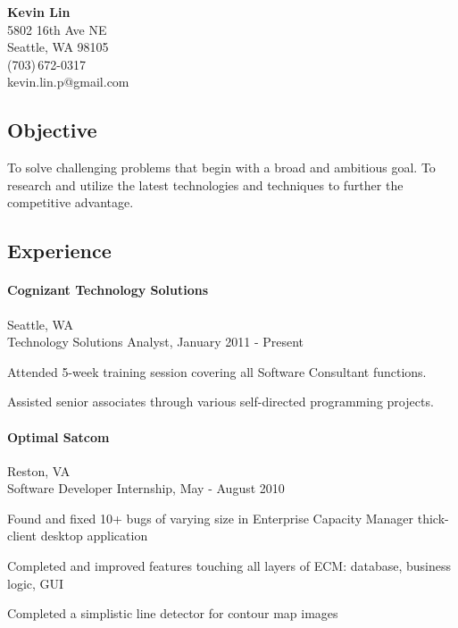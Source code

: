 \documentclass[10pt]{article}
\begin{document}
\begin{center}
\textbf{Kevin Lin} \\
5802 16th Ave NE \\ Seattle, WA 98105 \\
(703)\,672-0317\\
kevin.lin.p@gmail.com \\
\end{center}


\subsection*{Objective}
To solve challenging problems that begin with a broad and ambitious goal. To research and utilize the latest technologies and techniques to further the competitive advantage.


\subsection*{Experience}

\paragraph*{Cognizant Technology Solutions}
Seattle, WA\\
Technology Solutions Analyst, January 2011 - Present
\begin{compactitem}
\item Attended 5-week training session covering all Software Consultant functions.
\item Assisted senior associates through various self-directed programming projects.
\end{compactitem}

\paragraph*{Optimal Satcom}
Reston, VA\\
Software Developer Internship, May - August 2010
\begin{compactitem}
\item Found and fixed 10+ bugs of varying size in Enterprise Capacity Manager thick-client desktop application
\item Completed and improved features touching all layers of ECM: database, business logic, GUI
\item Completed a simplistic line detector for contour map images
\end{compactitem}
\end{document}

